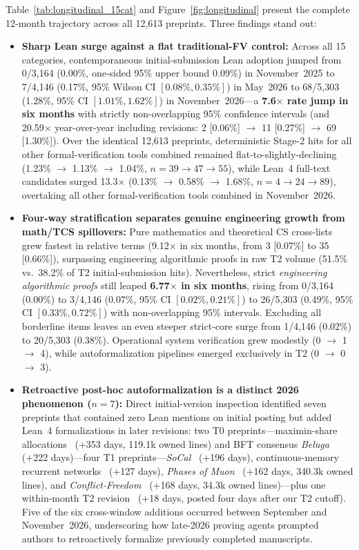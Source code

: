 \documentclass[11pt,letterpaper]{article}
\begin{document}
Table~\ref{tab:longitudinal_15cat} and Figure~\ref{fig:longitudinal} present the complete 12-month trajectory across all 12,613 preprints. Three findings stand out:
\begin{itemize}
  \item \textbf{Sharp Lean surge against a flat traditional-FV control:} Across all 15 categories, contemporaneous initial-submission Lean adoption jumped from 0/3,164 (0.00\%, one-sided 95\% upper bound 0.09\%) in November~2025 to 7/4,146 (0.17\%, 95\% Wilson CI $[0.08\%, 0.35\%]$) in May~2026 to 68/5,303 (1.28\%, 95\% CI $[1.01\%, 1.62\%]$) in November~2026---a \textbf{7.6$\times$ rate jump in six months} with strictly non-overlapping 95\% confidence intervals (and 20.59$\times$ year-over-year including revisions: 2 [0.06\%] $\rightarrow$ 11 [0.27\%] $\rightarrow$ 69 [1.30\%]). Over the identical 12,613 preprints, deterministic Stage-2 hits for all other formal-verification tools combined remained flat-to-slightly-declining (1.23\% $\rightarrow$ 1.13\% $\rightarrow$ 1.04\%, $n = 39 \rightarrow 47 \rightarrow 55$), while Lean~4 full-text candidates surged 13.3$\times$ (0.13\% $\rightarrow$ 0.58\% $\rightarrow$ 1.68\%, $n = 4 \rightarrow 24 \rightarrow 89$), overtaking all other formal-verification tools combined in November~2026.
  \item \textbf{Four-way stratification separates genuine engineering growth from math/TCS spillovers:} Pure mathematics and theoretical CS cross-lists grew fastest in relative terms (9.12$\times$ in six months, from 3 [0.07\%] to 35 [0.66\%]), surpassing engineering algorithmic proofs in raw T2 volume (51.5\% vs.\ 38.2\% of T2 initial-submission hits). Nevertheless, strict \emph{engineering algorithmic proofs} still leaped \textbf{6.77$\times$ in six months}, rising from 0/3,164 (0.00\%) to 3/4,146 (0.07\%, 95\% CI $[0.02\%, 0.21\%]$) to 26/5,303 (0.49\%, 95\% CI $[0.33\%, 0.72\%]$) with non-overlapping 95\% intervals. Excluding all borderline items leaves an even steeper strict-core surge from 1/4,146 (0.02\%) to 20/5,303 (0.38\%). Operational system verification grew modestly (0 $\rightarrow$ 1 $\rightarrow$ 4), while autoformalization pipelines emerged exclusively in T2 (0 $\rightarrow$ 0 $\rightarrow$ 3).
  \item \textbf{Retroactive post-hoc autoformalization is a distinct 2026 phenomenon ($n = 7$):} Direct initial-version inspection identified seven preprints that contained zero Lean mentions on initial posting but added Lean~4 formalizations in later revisions: two T0 preprints---maximin-share allocations~\cite{arxiv2511_13056} (+353 days, 119.1k owned lines) and BFT consensus \emph{Beluga}~\cite{arxiv2511_15517} (+222 days)---four T1 preprints---\emph{SoCal}~\cite{arxiv2605_01140} (+196 days), continuous-memory recurrent networks~\cite{arxiv2605_03338} (+127 days), \emph{Phases of Muon}~\cite{arxiv2605_09552} (+162 days, 340.3k owned lines), and \emph{Conflict-Freedom}~\cite{arxiv2605_19531} (+168 days, 34.3k owned lines)---plus one within-month T2 revision~\cite{arxiv2611_07818} (+18 days, posted four days after our T2 cutoff). Five of the six cross-window additions occurred between September and November~2026, underscoring how late-2026 proving agents prompted authors to retroactively formalize previously completed manuscripts.

\end{itemize}
\end{document}
